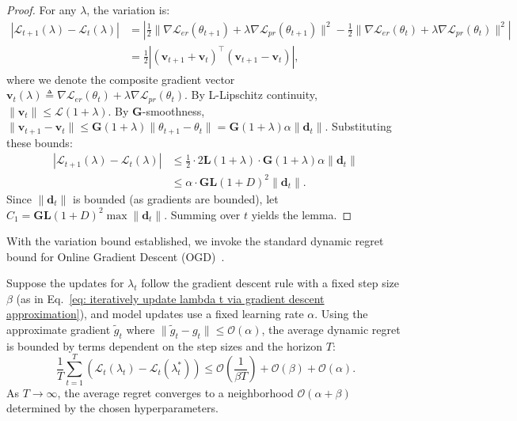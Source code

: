 \begin{proof}
For any $\lambda$, the variation is:
\begin{align}
    |\mathcal{L}_{t+1}(\lambda) - \mathcal{L}_t(\lambda)| &= \left| \frac{1}{2}\|\nabla \mathcal{L}_{er}(\theta_{t+1}) + \lambda \nabla \mathcal{L}_{pr}(\theta_{t+1})\|^2 - \frac{1}{2}\|\nabla \mathcal{L}_{er}(\theta_t) + \lambda \nabla \mathcal{L}_{pr}(\theta_t)\|^2 \right| \\
    &= \frac{1}{2} \left| \left( \mathbf{v}_{t+1} + \mathbf{v}_t \right)^\top \left( \mathbf{v}_{t+1} - \mathbf{v}_t \right) \right|,
\end{align}
where we denote the composite gradient vector $\mathbf{v}_t(\lambda) \triangleq \nabla \mathcal{L}_{er}(\theta_t) + \lambda \nabla \mathcal{L}_{pr}(\theta_t)$.
By L-Lipschitz continuity, $\|\mathbf{v}_t\| \le \mathcal{L}(1+\lambda)$. By $\mathbf{G}$-smoothness, $\|\mathbf{v}_{t+1} - \mathbf{v}_t\| \le \mathbf{G}(1+\lambda)\|\theta_{t+1} - \theta_t\| = \mathbf{G}(1+\lambda)\alpha \|\mathbf{d}_t\|$.
Substituting these bounds:
\begin{align}
    |\mathcal{L}_{t+1}(\lambda) - \mathcal{L}_t(\lambda)| &\le \frac{1}{2} \cdot 2\mathbf{L}(1+\lambda) \cdot \mathbf{G}(1+\lambda)\alpha \|\mathbf{d}_t\| \\
    &\le \alpha \cdot \mathbf{G} \mathbf{L} (1+D)^2 \|\mathbf{d}_t\|.
\end{align}
Since $\|\mathbf{d}_t\|$ is bounded (as gradients are bounded), let $C_1 = \mathbf{G} \mathbf{L} (1+D)^2 \max \|\mathbf{d}_t\|$. Summing over $t$ yields the lemma.
\end{proof}

With the variation bound established, we invoke the standard dynamic regret bound for Online Gradient Descent (OGD)~\cite{Onlineconvexprogramming, jadbabaie2015onlineoptimizationcompeting}.

\begin{theorem}
\label{thm:dynamic_regret}
Suppose the updates for $\lambda_t$ follow the gradient descent rule with a fixed step size $\beta$ (as in Eq.~\ref{eq: iteratively update lambda t via gradient descent approximation}), and model updates use a fixed learning rate $\alpha$. Using the approximate gradient $\tilde{g}_t$ where $\|\tilde{g}_t - g_t\| \le \mathcal{O}(\alpha)$, the average dynamic regret is bounded by terms dependent on the step sizes and the horizon $T$:
\begin{equation}
    \frac{1}{T} \sum_{t=1}^T \left( \mathcal{L}_t(\lambda_t) - \mathcal{L}_t(\lambda_t^*) \right) \le \mathcal{O}\left(\frac{1}{\beta T}\right) + \mathcal{O}(\beta) + \mathcal{O}(\alpha).
\end{equation}
As $T \to \infty$, the average regret converges to a neighborhood $\mathcal{O}(\alpha + \beta)$ determined by the chosen hyperparameters.
\end{theorem}

